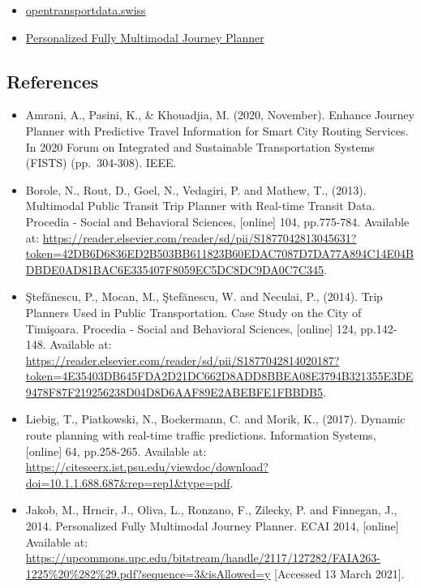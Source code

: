 \documentclass[
]{book}
\providecommand{\tightlist}{%
  \setlength{\itemsep}{0pt}\setlength{\parskip}{0pt}}
\begin{document}
\begin{itemize}
\tightlist
\item
  \href{https://opentransportdata.swiss/en/cookbook/open-journey-planner-ojp/}{opentransportdata.swiss}
\item
  \href{https://upcommons.upc.edu/bitstream/handle/2117/127282/FAIA263-1225\%20\%282\%29.pdf?sequence=3\&isAllowed=y}{Personalized Fully Multimodal Journey Planner}
\end{itemize}

\hypertarget{references-14}{%
\subsection*{References}\label{references-14}}

\begin{itemize}
\tightlist
\item
  Amrani, A., Pasini, K., \& Khouadjia, M. (2020, November). Enhance Journey Planner with Predictive Travel Information for Smart City Routing Services. In 2020 Forum on Integrated and Sustainable Transportation Systems (FISTS) (pp.~304-308). IEEE.
\item
  Borole, N., Rout, D., Goel, N., Vedagiri, P. and Mathew, T., (2013). Multimodal Public Transit Trip Planner with Real-time Transit Data. Procedia - Social and Behavioral Sciences, {[}online{]} 104, pp.775-784. Available at: \url{https://reader.elsevier.com/reader/sd/pii/S1877042813045631?token=42DB6D6836ED2B503BB611823B60EDAC7087D7DA77A894C14E04BDBDE0AD81BAC6E335407F8059EC5DC8DC9DA0C7C345}.
\item
  Ştefănescu, P., Mocan, M., Ştefănescu, W. and Neculai, P., (2014). Trip Planners Used in Public Transportation. Case Study on the City of Timişoara. Procedia - Social and Behavioral Sciences, {[}online{]} 124, pp.142-148. Available at: \url{https://reader.elsevier.com/reader/sd/pii/S1877042814020187?token=4E35403DB645FDA2D21DC662D8ADD8BBEA08E3794B321355E3DE9478F87F219256238D04D8D6AAF89E2ABEBFE1FBBDB5}.
\item
  Liebig, T., Piatkowski, N., Bockermann, C. and Morik, K., (2017). Dynamic route planning with real-time traffic predictions. Information Systems, {[}online{]} 64, pp.258-265. Available at: \url{https://citeseerx.ist.psu.edu/viewdoc/download?doi=10.1.1.688.687\&rep=rep1\&type=pdf}.
\item
  Jakob, M., Hrncir, J., Oliva, L., Ronzano, F., Zilecky, P. and Finnegan, J., 2014. Personalized Fully Multimodal Journey Planner. ECAI 2014, {[}online{]} Available at: \url{https://upcommons.upc.edu/bitstream/handle/2117/127282/FAIA263-1225\%20\%282\%29.pdf?sequence=3\&isAllowed=y} {[}Accessed 13 March 2021{]}.

\end{itemize}
\end{document}
